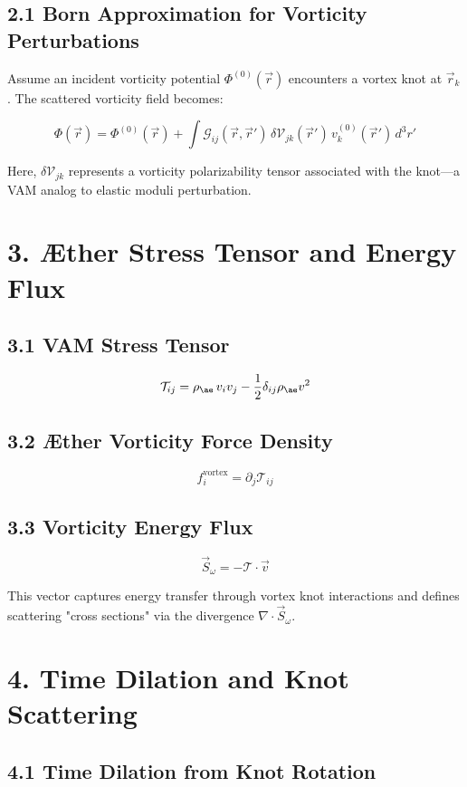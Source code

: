 \subsection*{2.1 Born Approximation for Vorticity Perturbations}

Assume an incident vorticity potential \(\Phi^{(0)}(\vec{r})\) encounters a vortex knot at \(\vec{r}_k\). The scattered vorticity field becomes:

\[
\Phi(\vec{r}) = \Phi^{(0)}(\vec{r}) + \int \mathcal{G}_{ij}(\vec{r}, \vec{r}') \, \delta \mathcal{V}_{jk}(\vec{r}') \, v_k^{(0)}(\vec{r}') \, d^3r'
\]

Here, \(\delta \mathcal{V}_{jk}\) represents a vorticity polarizability tensor associated with the knot—a VAM analog to elastic moduli perturbation.

\section*{3. Æther Stress Tensor and Energy Flux}

\subsection*{3.1 VAM Stress Tensor}

\[
\mathcal{T}_{ij} = \rho_{\ae} \, v_i v_j - \frac{1}{2} \delta_{ij} \rho_{\ae} v^2
\]

\subsection*{3.2 Æther Vorticity Force Density}

\[
f_i^{\text{vortex}} = \partial_j \mathcal{T}_{ij}
\]

\subsection*{3.3 Vorticity Energy Flux}

\[
\vec{S}_\omega = - \mathcal{T} \cdot \vec{v}
\]

This vector captures energy transfer through vortex knot interactions and defines scattering "cross sections" via the divergence \(\nabla \cdot \vec{S}_\omega\).

\section*{4. Time Dilation and Knot Scattering}

\subsection*{4.1 Time Dilation from Knot Rotation}

